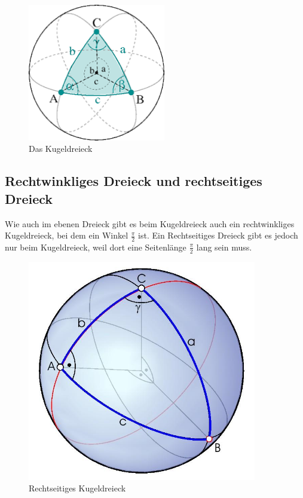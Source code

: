 \begin{figure}
	\begin{center}
		\includegraphics[width=6cm]{papers/nav/bilder/kugel1.png}
		\caption[Das Kugeldreieck]{Das Kugeldreieck}
	\end{center}
	
\end{figure}

\subsection{Rechtwinkliges Dreieck und rechtseitiges Dreieck}
Wie auch im ebenen Dreieck gibt es beim Kugeldreieck auch ein rechtwinkliges Kugeldreieck, bei dem ein Winkel $\frac{\pi}{2}$ ist. 
Ein Rechtseitiges Dreieck gibt es jedoch nur beim Kugeldreieck, weil dort eine Seitenlänge $\frac{\pi}{2}$ lang sein muss.
\begin{figure}
	
	\begin{center}
		\includegraphics[width=10cm]{papers/nav/bilder/recht.jpg}
		\caption[Rechtseitiges Kugeldreieck]{Rechtseitiges Kugeldreieck}
	\end{center}	
\end{figure}

